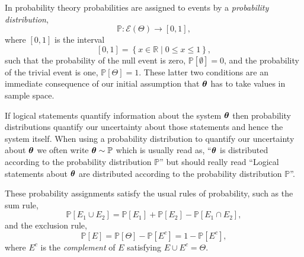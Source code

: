 \documentclass[11pt, oneside]{article}
\newcommand{\PP}{ \mathbb{P} }
\newcommand{\RR}{ \mathbb{R} }
\newcommand{\bt}{ \mbox{\boldmath{$\theta$}} }
\begin{document}
In probability theory probabilities are assigned to events by a \emph{probability 
distribution},
%
\begin{equation*}
\PP : \mathcal{E} \! \left( \Theta \right) \rightarrow \left[0, 1 \right],
\end{equation*}
%
where $\left[0, 1\right]$ is the interval
%
\begin{equation*}
\left[ 0, 1 \right] = \left\{ x \in \RR \mid 0 \le x \le 1 \right\},
\end{equation*}
%
such that the probability of the null event is zero, 
$\PP \! \left[ \emptyset \right] = 0$, and the probability of the trivial
event is one, $\PP \! \left[ \Theta \right] = 1$.  These latter
two conditions are an immediate consequence of our initial
assumption that $\bt$ has to take values in sample space.

If logical statements quantify information about the system $\bt$ then
probability distributions quantify our uncertainty about those statements
and hence the system itself.  When using a probability distribution to 
quantify our uncertainty about $\bt$ we often write $\bt \sim \PP$ which 
is usually read as, ``$\bt$ is distributed according to the probability 
distribution $\PP$'' but should really read ``Logical statements about 
$\bt$ are distributed according to the probability distribution $\PP$''.

These probability assignments satisfy the usual rules of probability, 
such as the sum rule,
%
\begin{equation*}
\PP \! \left[ E_{1} \cup E_{2} \right]
= 
\PP \! \left[ E_{1} \right] + \PP \! \left[ E_{2} \right] 
- \PP \! \left[ E_{1} \cap E_{2} \right],
\end{equation*}
%
and the exclusion rule,
%
\begin{equation*}
\PP \! \left[ E \right] 
= 
\PP \! \left[ \Theta \right] - \PP \! \left[ E^{c} \right]
=
1 - \PP \! \left[ E^{c} \right],
\end{equation*}
%
where $E^{c}$ is the \emph{complement} of $E$ satisfying
$E \cup E^{c} = \Theta$.
\end{document}

